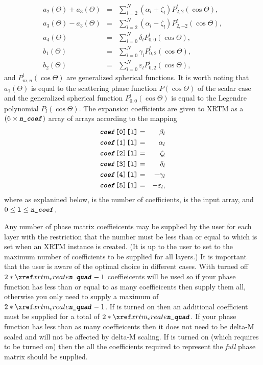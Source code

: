 {\begin{eqnarray*}
a_{2}(\Theta) + a_{3}(\Theta) &=& \sum^{N}_{l = 2} (\alpha_{l} + \zeta_{l}) P^{l}_{2,2}(\cos{\Theta}), \\
a_{3}(\Theta) - a_{3}(\Theta) &=& \sum^{N}_{l = 2} (\alpha_{l} - \zeta_{l}) P^{l}_{2,-2}(\cos{\Theta}), \\
a_{4}(\Theta) &=& \sum^{N}_{l = 0} \delta_{l} P^{l}_{0,0}(\cos{\Theta}), \\
b_{1}(\Theta) &=& \sum^{N}_{l = 0} \gamma_{l} P^{l}_{0,2}(\cos{\Theta}), \\
b_{2}(\Theta) &=& \sum^{N}_{l = 0} \varepsilon_{l} P^{l}_{0,2}(\cos{\Theta}),
\end{eqnarray*}
and $P^{l}_{m,n}(\cos{\Theta})$ are generalized spherical functions.  It is worth noting that $a_{1}(\Theta)$ is equal to the scattering phase function $P(\cos{\Theta})$ of the scalar case and the generalized spherical function $P^{l}_{0,0}(\cos{\Theta})$ is equal to the Legendre polynomial $P_{l}(\cos{\Theta})$.  The expansion coefficients are given to XRTM as a $(6 \times \texttt{\textit{\textbf{n\_coef}}})$ array of arrays according to the mapping
\begin{eqnarray*}
\texttt{\textit{\textbf{coef}}[0][l]} &=& \beta_{l} \\
\texttt{\textit{\textbf{coef}}[1][l]} &=& \alpha_{l} \\
\texttt{\textit{\textbf{coef}}[2][l]} &=& \zeta_{l} \\
\texttt{\textit{\textbf{coef}}[3][l]} &=& \delta_{l} \\
\texttt{\textit{\textbf{coef}}[4][l]} &=& -\gamma_{l} \\
\texttt{\textit{\textbf{coef}}[5][l]} &=& -\varepsilon_{l},
\end{eqnarray*}
where as explanined below,  is the number of coefficients,  is the input array, and $0 \le \texttt{l} \le \texttt{\textit{\textbf{n\_coef}}}$.

Any number of phase matrix coeffieicents may be supplied by the user for each layer with the restriction that the number must be less than or equal to  which is set when an XRTM instance is created. (It is up to the user to set  to the maximum number of coefficients to be supplied for all layers.)  It is important that the user is aware of the optimal choice in different cases.  With  turned off $2 * \createarg{n\_quad} - 1$ coeffieicents will be used so if your phase function has less than or equal to as many coeffieicents then supply them all, otherwise you only need to supply a maximum of $2 * \createarg{n\_quad} - 1$.  If  is turned on then an additional coefficient must be supplied for a total of $2 * \createarg{n\_quad}$.  If your phase function has less than as many coeffieicents then it does not need to be delta-M  scaled and will not be affected by delta-M scaling.  If  is turned on (which requires   to be turned on) then the all the coefficients required to represent the \emph{full} phase matrix should be supplied.

}
